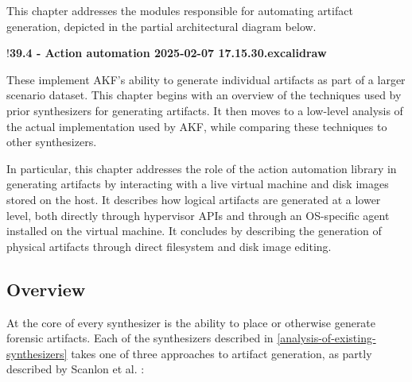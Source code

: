 This chapter addresses the modules responsible for automating artifact
generation, depicted in the partial architectural diagram below.

!\textbf{39.4 - Action automation 2025-02-07 17.15.30.excalidraw}

These implement AKF's ability to generate individual artifacts as part
of a larger scenario dataset. This chapter begins with an overview of
the techniques used by prior synthesizers for generating artifacts. It
then moves to a low-level analysis of the actual implementation used by
AKF, while comparing these techniques to other synthesizers.

In particular, this chapter addresses the role of the action automation
library in generating artifacts by interacting with a live virtual
machine and disk images stored on the host. It describes how logical
artifacts are generated at a lower level, both directly through
hypervisor APIs and through an OS-specific agent installed on the
virtual machine. It concludes by describing the generation of physical
artifacts through direct filesystem and disk image editing.

\subsection{Overview}\label{overview}

At the core of every synthesizer is the ability to place or otherwise
generate forensic artifacts. Each of the synthesizers described in
\ref{analysis-of-existing-synthesizers} takes one of three approaches to artifact generation, as
partly described by Scanlon et al.
\cite{scanlonEviPlantEfficientDigital2017}:

